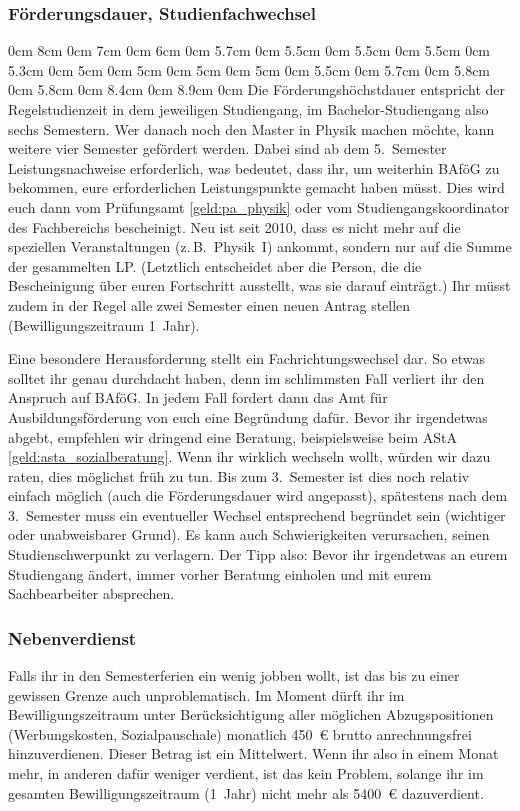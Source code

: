 \begin{multicols*}{2}
\subsubsection{Förderungsdauer, Studienfachwechsel}
0cm \columnwidth
0cm \columnwidth
0cm \columnwidth
0cm \columnwidth
0cm \columnwidth
0cm \columnwidth
0cm 8cm
0cm 7cm
0cm 6cm
0cm 5.7cm
0cm 5.5cm
0cm 5.5cm
0cm 5.5cm
0cm 5.3cm
0cm 5cm
0cm 5cm
0cm 5cm
0cm 5cm
0cm 5.5cm
0cm 5.7cm
0cm 5.8cm
0cm 5.8cm
0cm 8.4cm
0cm 8.9cm
0cm \columnwidth
Die Förderungshöchstdauer entspricht der Regelstudienzeit in dem jeweiligen Studiengang, im Bachelor-Studiengang also sechs Semestern.
Wer danach noch den Master in Physik machen möchte, kann weitere vier Semester gefördert werden.
Dabei sind ab dem 5.~Semester Leistungsnachweise erforderlich, was bedeutet, dass ihr, um weiterhin BAföG zu bekommen, eure erforderlichen Leistungspunkte gemacht haben müsst.
Dies wird euch dann vom Prüfungsamt \cref{geld:pa_physik} oder vom Studiengangskoordinator des Fachbereichs bescheinigt.
Neu ist seit 2010, dass es nicht mehr auf die speziellen Veranstaltungen (z.\,B.\ Physik~I) ankommt, sondern nur auf die Summe der gesammelten LP.
(Letztlich entscheidet aber die Person, die die Bescheinigung über euren Fortschritt ausstellt, was sie darauf einträgt.)
Ihr müsst zudem in der Regel alle zwei Semester einen neuen Antrag stellen (Bewilligungszeitraum 1~Jahr).

Eine besondere Herausforderung stellt ein Fachrichtungswechsel dar.
So etwas solltet ihr genau durchdacht haben, denn im schlimmsten Fall verliert ihr den Anspruch auf BAföG.
In jedem Fall fordert dann das Amt für Ausbildungsförderung von euch eine Begründung dafür.
Bevor ihr irgendetwas abgebt, empfehlen wir dringend eine Beratung, beispielsweise beim AStA \cref{geld:asta_sozialberatung}.
Wenn ihr wirklich wechseln wollt, würden wir dazu raten, dies möglichst früh zu tun.
Bis zum 3.~Semester ist dies noch relativ einfach möglich (auch die Förderungsdauer wird angepasst), spätestens nach dem 3.~Semester muss ein eventueller Wechsel entsprechend begründet sein (wichtiger oder unabweisbarer Grund).
Es kann auch Schwierigkeiten verursachen, seinen Studienschwerpunkt zu verlagern.
Der Tipp also:
Bevor ihr irgendetwas an eurem Studiengang ändert, immer vorher Beratung einholen und mit eurem Sachbearbeiter absprechen.

\subsubsection{Nebenverdienst}
Falls ihr in den Semesterferien ein wenig jobben wollt, ist das bis zu einer gewissen Grenze auch unproblematisch.
Im Moment dürft ihr im Bewilligungszeitraum unter Berücksichtigung aller möglichen Abzugspositionen (Werbungskosten, Sozialpauschale) monatlich \SI{450}{\euro} brutto anrechnungsfrei hinzuverdienen.
Dieser Betrag ist ein Mittelwert.
Wenn ihr also in einem Monat mehr, in anderen dafür weniger verdient, ist das kein Problem, solange ihr im gesamten Bewilligungszeitraum (1~Jahr) nicht mehr als \SI{5400}{\euro} dazuverdient.


\end{multicols*}
